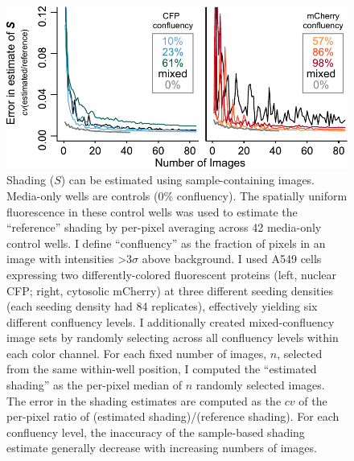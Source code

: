   \begin{figure}[!bt]
  \centering
  \includegraphics[width=5in]{FIGS/imaging/samplenum.pdf}
  {\singlespacing 
  \caption[ Estimating $S$ from sample-containing images.]
            { Shading ($S$) can be estimated using sample-containing
             images. Media-only wells are controls (0\% confluency).
             The spatially uniform fluorescence in these control wells was used
             to estimate the 
             ``reference'' shading by per-pixel averaging
             across 42 media-only control wells. I define
             ``confluency'' as the fraction of pixels in an image
             with intensities >3$\sigma$ above background.
             I used A549 cells expressing two differently-colored
             fluorescent proteins (left, nuclear CFP; right,
             cytosolic mCherry) at three different seeding
             densities (each seeding density had 84 replicates),
             effectively yielding six different confluency
             levels. I additionally created mixed-confluency
             image sets by randomly selecting across all
             confluency levels within each color channel.
             For each fixed number of images, $n$,
             selected from the same within-well position, I computed
             the ``estimated shading'' as the per-pixel median of
             $n$ randomly selected images. The error in the shading
             estimates are computed as the $cv$ of the per-pixel 
             ratio of (estimated shading)/(reference shading).
             For each confluency level, the inaccuracy of the
             sample-based shading estimate generally decrease
             with increasing numbers of images.}
  \label{fig:correction:samplenum}}
  \end{figure}

  

